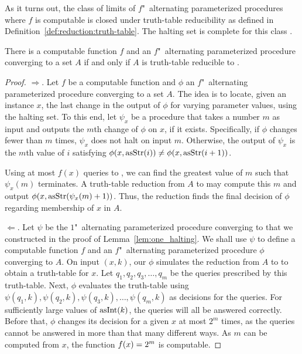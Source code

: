 As it turns out, the class of limits of $f$"~alternating parameterized procedures where $f$ is computable is closed under truth-table reducibility as defined in Definition~\ref{def:reduction:truth-table}.
The halting set is complete for this class \parencite{epstein1981hierarchies,arslanov1997degree,downey2010algorithmic}.
\begin{theorem}
\label{thm:truthtable_halt}%
  There is a computable function $f$ and an $f$"~alternating parameterized procedure converging to a set $A$ if and only if $A$ is truth-table reducible to .
\end{theorem}
\begin{proof}
  $\Longrightarrow$.
  Let $f$ be a computable function and $\phi$ an $f$"~alternating parameterized procedure converging to a set $A$.
  The idea is to locate, given an instance $x$, the last change in the output of $\phi$ for varying parameter values, using the halting set.
  To this end, let $\psi_x$ be a procedure that takes a number $m$ as input and outputs the $m$th change of $\phi$ on $x$, if it exists.
  Specifically, if $\phi$ changes fewer than $m$ times, $\psi_x$ does not halt on input $m$.
  Otherwise, the output of $\psi_x$ is the $m$th value of $i$ satisfying $\phi(x, \operatorname{asStr}(i)) \neq \phi(x, \operatorname{asStr}(i + 1))$.

  Using at most $f(x)$ queries to , we can find the greatest value of $m$ such that $\psi_x(m)$ terminates.
  A truth-table reduction from $A$ to  may compute this $m$ and output $\phi(x, \operatorname{asStr}(\psi_x(m) + 1))$.
  Thus, the reduction finds the final decision of $\phi$ regarding membership of $x$ in $A$.

  $\Longleftarrow$.
  Let $\psi$ be the $1$"~alternating parameterized procedure converging to  that we constructed in the proof of Lemma~\ref{lem:one_halting}.
  We shall use $\psi$ to define a computable function $f$ and an $f$"~alternating parameterized procedure $\phi$ converging to $A$.
  On input $(x, k)$, our $\phi$ simulates the reduction from $A$ to  to obtain a truth-table for $x$.
  Let $q_1, q_2, q_3, \ldots, q_m$ be the queries prescribed by this truth-table.
  Next, $\phi$ evaluates the truth-table using $\psi(q_1, k), \psi(q_2, k), \psi(q_3, k), \ldots, \psi(q_m, k)$ as decisions for the queries.
  For sufficiently large values of $\operatorname{asInt}(k)$, the queries will all be answered correctly.
  Before that, $\phi$ changes its decision for a given $x$ at most $2^m$ times, as the queries cannot be answered in more than that many different ways.
  As $m$ can be computed from $x$, the function $f(x) = 2^m$ is computable.
\end{proof}

